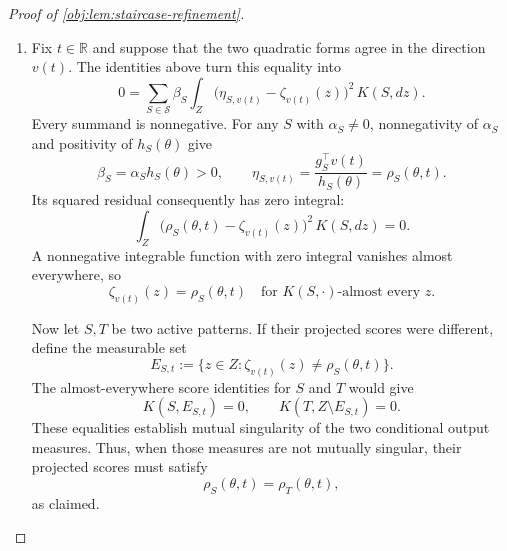 \documentclass[11pt]{article}
\begin{document}
\begin{proof}[Proof of \cref{obj:lem:staircase-refinement}]
\begin{enumerate}
\item
Fix \(t\in\mathbb R\) and suppose that the two quadratic forms agree in the direction \(v(t)\). The identities above turn this equality into
\[
0=
\sum_{S\in\mathcal S}\beta_S
\int_Z
\bigl(\eta_{S,v(t)}-\zeta_{v(t)}(z)\bigr)^2\,K(S,dz).
\]
Every summand is nonnegative. For any \(S\) with \(\alpha_S\ne0\), nonnegativity of \(\alpha_S\) and positivity of \(h_S(\theta)\) give
\[
\beta_S=\alpha_S h_S(\theta)>0,
\qquad
\eta_{S,v(t)}
=\frac{g_S^\top v(t)}{h_S(\theta)}
=\rho_S(\theta,t).
\]
Its squared residual consequently has zero integral:
\[
\int_Z
\bigl(\rho_S(\theta,t)-\zeta_{v(t)}(z)\bigr)^2\,K(S,dz)=0.
\]
A nonnegative integrable function with zero integral vanishes almost everywhere, so
\[
\zeta_{v(t)}(z)=\rho_S(\theta,t)
\quad\text{for \(K(S,\cdot)\)-almost every \(z\)}.
\]

Now let \(S,T\) be two active patterns. If their projected scores were different, define the measurable set
\[
E_{S,t}:=\{z\in Z:\zeta_{v(t)}(z)\ne\rho_S(\theta,t)\}.
\]
The almost-everywhere score identities for \(S\) and \(T\) would give
\[
K(S,E_{S,t})=0,
\qquad
K(T,Z\setminus E_{S,t})=0.
\]
These equalities establish mutual singularity of the two conditional output measures. Thus, when those measures are not mutually singular, their projected scores must satisfy
\[
\rho_S(\theta,t)=\rho_T(\theta,t),
\]
as claimed.

\end{enumerate}
\end{proof}




\end{document}
